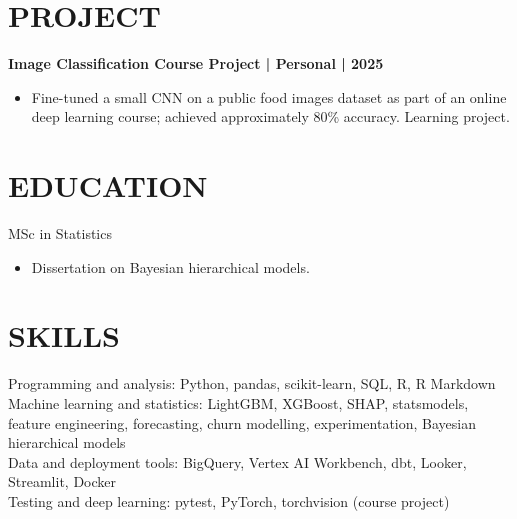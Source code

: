 \documentclass[11pt,a4paper]{article}
\begin{document}
\section*{PROJECT}
\textbf{Image Classification Course Project | Personal | 2025}
\begin{itemize}
\item Fine-tuned a small CNN on a public food images dataset as part of an online deep learning course; achieved approximately 80\% accuracy. Learning project.
\end{itemize}

\section*{EDUCATION}
MSc in Statistics
\begin{itemize}
\item Dissertation on Bayesian hierarchical models.
\end{itemize}

\section*{SKILLS}
Programming and analysis: Python, pandas, scikit-learn, SQL, R, R Markdown\\
Machine learning and statistics: LightGBM, XGBoost, SHAP, statsmodels, feature engineering, forecasting, churn modelling, experimentation, Bayesian hierarchical models\\
Data and deployment tools: BigQuery, Vertex AI Workbench, dbt, Looker, Streamlit, Docker\\
Testing and deep learning: pytest, PyTorch, torchvision (course project)
\end{document}
